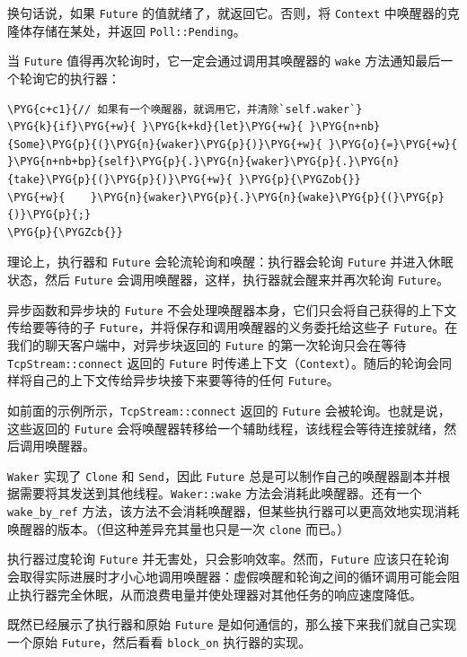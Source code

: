 换句话说，如果 \texttt{Future} 的值就绪了，就返回它。否则，将 \texttt{Context} 中唤醒器的克隆体存储在某处，并返回 \texttt{Poll::Pending}。

当 \texttt{Future} 值得再次轮询时，它一定会通过调用其唤醒器的 \texttt{wake} 方法通知最后一个轮询它的执行器：

\begin{Verbatim}[commandchars=\\\{\},breaklines=true,breakanywhere=true,fontsize=\codefont,xleftmargin=17bp]
\PYG{c+c1}{// 如果有一个唤醒器，就调用它，并清除`self.waker`}
\PYG{k}{if}\PYG{+w}{ }\PYG{k+kd}{let}\PYG{+w}{ }\PYG{n+nb}{Some}\PYG{p}{(}\PYG{n}{waker}\PYG{p}{)}\PYG{+w}{ }\PYG{o}{=}\PYG{+w}{ }\PYG{n+nb+bp}{self}\PYG{p}{.}\PYG{n}{waker}\PYG{p}{.}\PYG{n}{take}\PYG{p}{(}\PYG{p}{)}\PYG{+w}{ }\PYG{p}{\PYGZob{}}
\PYG{+w}{    }\PYG{n}{waker}\PYG{p}{.}\PYG{n}{wake}\PYG{p}{(}\PYG{p}{)}\PYG{p}{;}
\PYG{p}{\PYGZcb{}}
\end{Verbatim}

理论上，执行器和 \texttt{Future} 会轮流轮询和唤醒：执行器会轮询 \texttt{Future} 并进入休眠状态，然后 \texttt{Future} 会调用唤醒器，这样，执行器就会醒来并再次轮询 \texttt{Future}。

异步函数和异步块的 \texttt{Future} 不会处理唤醒器本身，它们只会将自己获得的上下文传给要等待的子 \texttt{Future}，并将保存和调用唤醒器的义务委托给这些子 \texttt{Future}。在我们的聊天客户端中，对异步块返回的 \texttt{Future} 的第一次轮询只会在等待 \texttt{TcpStream::connect} 返回的 \texttt{Future} 时传递上下文（\texttt{Context}）。随后的轮询会同样将自己的上下文传给异步块接下来要等待的任何 \texttt{Future}。

如前面的示例所示，\texttt{TcpStream::connect} 返回的 \texttt{Future} 会被轮询。也就是说，这些返回的 \texttt{Future} 会将唤醒器转移给一个辅助线程，该线程会等待连接就绪，然后调用唤醒器。

\texttt{Waker} 实现了 \texttt{Clone} 和 \texttt{Send}，因此 \texttt{Future} 总是可以制作自己的唤醒器副本并根据需要将其发送到其他线程。\texttt{Waker::wake} 方法会消耗此唤醒器。还有一个 \texttt{wake\_by\_ref} 方法，该方法不会消耗唤醒器，但某些执行器可以更高效地实现消耗唤醒器的版本。（但这种差异充其量也只是一次 \texttt{clone} 而已。）

执行器过度轮询 \texttt{Future} 并无害处，只会影响效率。然而，\texttt{Future} 应该只在轮询会取得实际进展时才小心地调用唤醒器：虚假唤醒和轮询之间的循环调用可能会阻止执行器完全休眠，从而浪费电量并使处理器对其他任务的响应速度降低。

既然已经展示了执行器和原始 \texttt{Future} 是如何通信的，那么接下来我们就自己实现一个原始 \texttt{Future}，然后看看 \texttt{block\_on} 执行器的实现。

